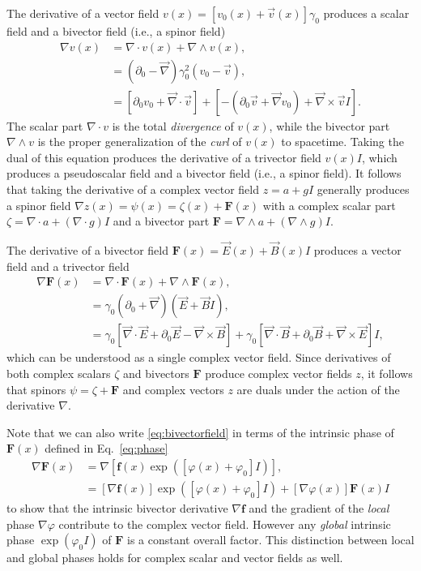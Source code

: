 \documentclass[1p,sort&compress]{elsarticle}
\numberwithin{equation}{section}
\newcommand{\rv}[1]{\vec{#1}}
\newcommand{\bv}[1]{\mathbf{#1}}
\begin{document}
The derivative of a vector field $v(x) = [v_0(x) + \rv{v}(x)]\gamma_0$ produces a scalar field and a bivector field (i.e., a spinor field)
\begin{align}\label{eq:vectorfield}
  \nabla v(x) &= \nabla \cdot v(x) + \nabla \wedge v(x), \\ 
  &= (\partial_0 - \rv{\nabla})\gamma_0^2(v_0 - \rv{v}), \nonumber \\
  &= [\partial_0 v_0 + \rv{\nabla}\cdot\rv{v}] + [-(\partial_0\rv{v} + \rv{\nabla}v_0) + \rv{\nabla}\times\rv{v}I]. \nonumber
\end{align}
The scalar part $\nabla \cdot v$ is the total \emph{divergence} of $v(x)$, while the bivector part $\nabla\wedge v$ is the proper generalization of the \emph{curl} of $v(x)$ to spacetime.  Taking the dual of this equation produces the derivative of a trivector field $v(x)I$, which produces a pseudoscalar field and a bivector field (i.e., a spinor field).  It follows that taking the derivative of a complex vector field $z = a + g I$ generally produces a spinor field $\nabla z(x) = \psi(x) = \zeta(x) + \bv{F}(x)$ with a complex scalar part $\zeta = \nabla \cdot a + (\nabla \cdot g) I$ and a bivector part $\bv{F} = \nabla \wedge a + (\nabla \wedge g)I$.

The derivative of a bivector field $\bv{F}(x) = \rv{E}(x) + \rv{B}(x)I$ produces a vector field and a trivector field
\begin{align}\label{eq:bivectorfield}
  \nabla \bv{F}(x) &= \nabla \cdot \bv{F}(x) + \nabla \wedge \bv{F}(x), \\
  &= \gamma_0(\partial_0 + \rv{\nabla})(\rv{E} + \rv{B} I), \nonumber \\
  &= \gamma_0\left[\rv{\nabla}\cdot\rv{E} + \partial_0 \rv{E} - \rv{\nabla}\times\rv{B}\right] + \gamma_0\left[\rv{\nabla}\cdot\rv{B} + \partial_0 \rv{B} + \rv{\nabla}\times\rv{E}\right]I, \nonumber
\end{align}
which can be understood as a single complex vector field.  Since derivatives of both complex scalars $\zeta$ and bivectors $\bv{F}$ produce complex vector fields $z$, it follows that spinors $\psi = \zeta + \bv{F}$ and complex vectors $z$ are duals under the action of the derivative $\nabla$.

Note that we can also write \eqref{eq:bivectorfield} in terms of the intrinsic phase of $\bv{F}(x)$ defined in Eq.~\eqref{eq:phase}
\begin{align}
  \nabla \bv{F}(x) &=  \nabla[\bv{f}(x) \exp([\varphi(x) + \varphi_0] I)], \\
  &= [\nabla \bv{f}(x)] \exp([\varphi(x) + \varphi_0] I) + [\nabla \varphi(x)] \bv{F}(x) I \nonumber
\end{align}
to show that the intrinsic bivector derivative $\nabla \bv{f}$ and the gradient of the \emph{local} phase $\nabla \varphi$ contribute to the complex vector field.  However any \emph{global} intrinsic phase $\exp(\varphi_0 I)$ of $\bv{F}$ is a constant overall factor.  This distinction between local and global phases holds for complex scalar and vector fields as well.
\end{document}
